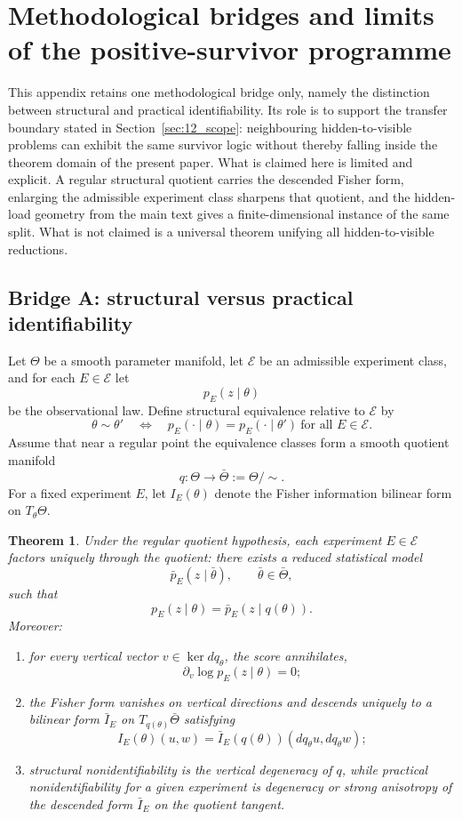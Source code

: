 \documentclass[11pt]{article}
\numberwithin{equation}{section}
\theoremstyle{thmcompact}
\newtheorem{theorem}{Theorem}[section]
\theoremstyle{remark}
\begin{document}
\section{Methodological bridges and limits of the positive-survivor programme}\label{app:bridges}

This appendix retains one methodological bridge only, namely the distinction between structural and practical identifiability. Its role is to support the transfer boundary stated in Section~\ref{sec:12_scope}: neighbouring hidden-to-visible problems can exhibit the same survivor logic without thereby falling inside the theorem domain of the present paper. What is claimed here is limited and explicit. A regular structural quotient carries the descended Fisher form, enlarging the admissible experiment class sharpens that quotient, and the hidden-load geometry from the main text gives a finite-dimensional instance of the same split. What is not claimed is a universal theorem unifying all hidden-to-visible reductions.

\subsection{Bridge A: structural versus practical identifiability}

Let $\Theta$ be a smooth parameter manifold, let $\mathcal E$ be an admissible experiment class, and for each $E\in\mathcal E$ let
\[
p_E(z\mid\theta)
\]
be the observational law. Define structural equivalence relative to $\mathcal E$ by
\[
\theta\sim\theta'\quad\Longleftrightarrow\quad p_E(\cdot\mid\theta)=p_E(\cdot\mid\theta')\ \text{for all }E\in\mathcal E.
\]
Assume that near a regular point the equivalence classes form a smooth quotient manifold
\[
q:\Theta\to \bar\Theta:=\Theta/\!\sim.
\]
For a fixed experiment $E$, let $I_E(\theta)$ denote the Fisher information bilinear form on $T_\theta\Theta$.

\begin{theorem}\label{thm:bridge-identifiability}
Under the regular quotient hypothesis, each experiment $E\in\mathcal E$ factors uniquely through the quotient: there exists a reduced statistical model
\[
\bar p_E(z\mid \bar\theta),\qquad \bar\theta\in\bar\Theta,
\]
such that
\[
p_E(z\mid\theta)=\bar p_E(z\mid q(\theta)).
\]
Moreover:
\begin{enumerate}
\item for every vertical vector $v\in\ker dq_\theta$, the score annihilates,
\[
\partial_v \log p_E(z\mid\theta)=0;
\]
\item the Fisher form vanishes on vertical directions and descends uniquely to a bilinear form $\bar I_E$ on $T_{q(\theta)}\bar\Theta$ satisfying
\[
I_E(\theta)(u,w)=\bar I_E(q(\theta))(dq_\theta u,dq_\theta w);
\]
\item structural nonidentifiability is the vertical degeneracy of $q$, while practical nonidentifiability for a given experiment is degeneracy or strong anisotropy of the descended form $\bar I_E$ on the quotient tangent.
\end{enumerate}
\end{theorem}
\end{document}
